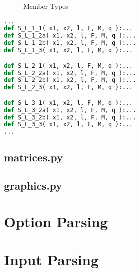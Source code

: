 \begin{figure}[h]%
    \centering
    \qquad

    \centering
    \qquad
    
    \caption{Member Types}%
    \label{fig:memberTypes}%
\end{figure}

\begin{inconsolata}
\begin{lstlisting}[language=python]
...
def S_L_1_1( x1, x2, l, F, M, q ):...
def S_L_1_2a( x1, x2, l, F, M, q ):...
def S_L_1_2b( x1, x2, l, F, M, q ):...
def S_L_1_3( x1, x2, l, F, M, q ):...

def S_L_2_1( x1, x2, l, F, M, q ):...
def S_L_2_2a( x1, x2, l, F, M, q ):...
def S_L_2_2b( x1, x2, l, F, M, q ):...
def S_L_2_3( x1, x2, l, F, M, q ):...

def S_L_3_1( x1, x2, l, F, M, q ):...
def S_L_3_2a( x1, x2, l, F, M, q ):...
def S_L_3_2b( x1, x2, l, F, M, q ):...
def S_L_3_3( x1, x2, l, F, M, q ):...
...
\end{lstlisting}
\end{inconsolata}

\subsection{matrices.py}
\label{subsec:matrices.py}


\subsection{graphics.py}
\label{subsec:graphics.py}


\pagebreak

\section{Option Parsing}
\label{sec:optparse}


\section{Input Parsing}
\label{sec:inputpars}

